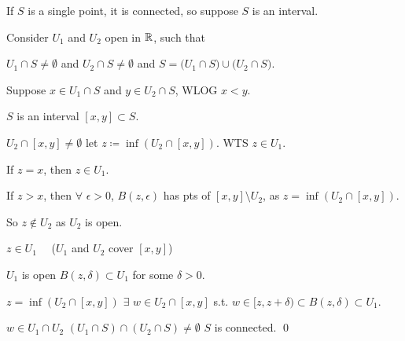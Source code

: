 \documentclass[10pt,aspectratio=149]{beamer}
\begin{document}
\begin{frame}

If $S$ is a single point, it is connected,
\pause
\quad
so suppose $S$ is an interval.

\pause
\medskip

Consider $U_1$ and $U_2$ open in ${\mathbb{R}}$, such that

\pause
$U_1 \cap S \not= \emptyset$ and $U_2 \cap S \not= \emptyset$ and $S =
\bigl( U_1 \cap S \bigr) \cup \bigl( U_2 \cap S \bigr)$.

\pause
Suppose $x \in U_1 \cap S$ and $y \in U_2 \cap S$, WLOG $x < y$.

\pause
$S$ is an interval \wthus $[x,y] \subset S$.

\pause
$U_2 \cap [x,y] \not= \emptyset$
\pause
\quad
let $z \coloneqq \inf (U_2 \cap [x,y])$.
\pause
\quad
WTS $z \in U_1$.

\pause
If $z = x$, then $z \in U_1$.

\pause
If $z > x$, then $\forall$ $\epsilon > 0$,
$B(z,\epsilon)$ has pts of $[x,y] \setminus U_2$,
as $z = \inf (U_2 \cap [x,y])$.

\pause
So $z \notin U_2$ as $U_2$ is open.

\pause
\thus \quad $z \in U_1$  ~~($U_1$ and $U_2$ cover $[x,y]$)

\pause
$U_1$ is open \wthus $B(z,\delta) \subset U_1$ for some $\delta > 0$.

\pause
$z = \inf (U_2 \cap [x,y])$
\pause
\wthus $\exists$
$w \in U_2 \cap [x,y]$ s.t. $w \in [z,z+\delta) \subset B(z,\delta) \subset U_1$.

\pause
\begin{center}
\end{center}

\pause
\thus\quad
$w \in U_1 \cap U_2$
\pause
\wthus
$(U_1 \cap S) \cap (U_2 \cap S) \not= \emptyset$
\pause
\wthus
$S$ is connected.
\qed

\end{frame}
\end{document}
